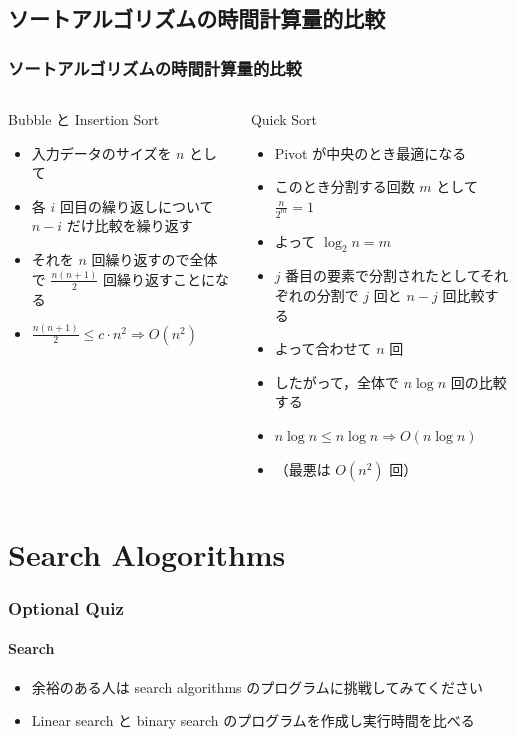 \subsection{ソートアルゴリズムの時間計算量的比較}
\begin{frame}
\frametitle{ソートアルゴリズムの時間計算量的比較}
  \begin{columns}[t,onlytextwidth]
    \begin{column}{0.5\linewidth}{Bubble と Insertion Sort}
      \begin{itemize}
\tiny
\item 入力データのサイズを $n$ として
\item 各 $i$ 回目の繰り返しについて \(n-i\) だけ比較を繰り返す
\item それを $n$ 回繰り返すので全体で \(\frac{n(n+1)}{2}\) 回繰り返すことになる
\item \(\frac{n(n+1)}{2}\leq c\cdot n^2\Rightarrow O(n^2)\)
      \end{itemize}
    \end{column}
    \begin{column}{0.5\linewidth}{Quick Sort}
      \begin{itemize}
\tiny
\item Pivot が中央のとき最適になる
\item このとき分割する回数 $m$ として \(\frac{n}{2^m}=1\)
\item よって \(\log_2 n=m\)
\item $j$ 番目の要素で分割されたとしてそれぞれの分割で $j$ 回と \(n-j\) 回比較する
\item よって合わせて $n$ 回
\item したがって，全体で \(n\log n\) 回の比較する
\item \(n\log n\leq n\log n \Rightarrow O(n\log n)\)
\item （最悪は \(O(n^2)\) 回）
      \end{itemize}
    \end{column}
  \end{columns}
\end{frame}
\section{Search Alogorithms}
\begin{frame}
\frametitle{Optional Quiz}
\framesubtitle{Search}
  \begin{itemize}
\item 余裕のある人は search algorithms のプログラムに挑戦してみてください
\item Linear search と binary search のプログラムを作成し実行時間を比べる
  \end{itemize}
\end{frame}
%
%

